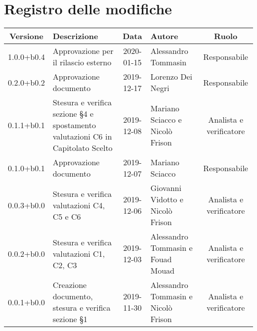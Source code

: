\section*{Registro delle modifiche}

\begin{center}
	\begin{longtable}{|c|p{3cm}|c|p{4cm}|c|}
	\hline
	\rowcolor{lighter-grayer}
	\textbf{Versione} & \textbf{Descrizione} & \textbf{Data} & \textbf{Autore} & \textbf{Ruolo} \\
	\hline
	\endfirsthead

	1.0.0+b0.4 & Approvazione per il rilascio esterno & 2020-01-15 & Alessandro Tommasin & Responsabile \\
	\hline
	0.2.0+b0.2 & Approvazione documento & 2019-12-17 & Lorenzo Dei Negri & Responsabile \\
	\hline
	0.1.1+b0.1 & Stesura e verifica sezione \S4 e spostamento valutazioni C6 in Capitolato Scelto & 2019-12-08 & Mariano Sciacco e Nicolò Frison & Analista e verificatore \\
	\hline
	0.1.0+b0.1 & Approvazione documento & 2019-12-07 & Mariano Sciacco & Responsabile \\
	\hline 
	0.0.3+b0.0 & Stesura e verifica valutazioni C4, C5 e C6 & 2019-12-06 & Giovanni Vidotto e Nicolò Frison & Analista e verificatore \\
	\hline
	0.0.2+b0.0 & Stesura e verifica valutazioni C1, C2, C3 & 2019-12-03 & Alessandro Tommasin e Fouad Mouad & Analista e verificatore \\
	\hline
	0.0.1+b0.0 & Creazione documento, stesura e verifica sezione \S1 & 2019-11-30 & Alessandro Tommasin e Nicolò Frison & Analista e verificatore \\
	\hline

	\end{longtable}
\end{center}
